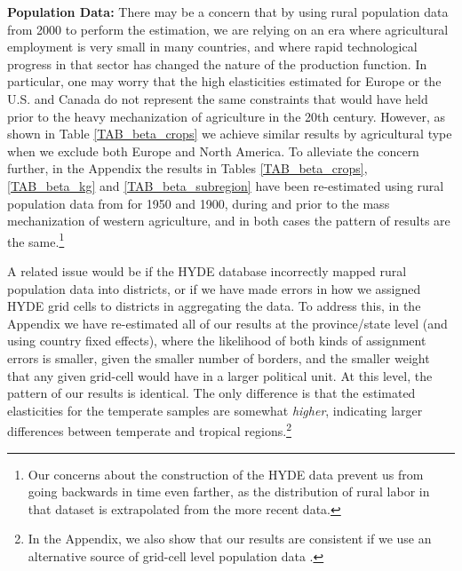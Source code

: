 \documentclass[11pt]{article}
\begin{document}
\vspace{.5cm}\noindent\textbf{Population Data:} There may be a concern that by using rural population data from 2000 to perform the estimation, we are relying on an era where agricultural employment is very small in many countries, and where rapid technological progress in that sector has changed the nature of the production function. In particular, one may worry that the high elasticities estimated for Europe or the U.S. and Canada do not represent the same constraints that would have held prior to the heavy mechanization of agriculture in the 20th century. However, as shown in Table \ref{TAB_beta_crops} we achieve similar results by agricultural type when we exclude both Europe and North America. To alleviate the concern further, in the Appendix the results in Tables \ref{TAB_beta_crops}, \ref{TAB_beta_kg} and \ref{TAB_beta_subregion} have been re-estimated using rural population data from \citet{hyde31} for 1950 and 1900, during and prior to the mass mechanization of western agriculture, and in both cases the pattern of results are the same.\footnote{Our concerns about the construction of the HYDE data prevent us from going backwards in time even farther, as the distribution of rural labor in that dataset is extrapolated from the more recent data.}

A related issue would be if the HYDE database incorrectly mapped rural population data into districts, or if we have made errors in how we assigned HYDE grid cells to districts in aggregating the data. To address this, in the Appendix we have re-estimated all of our results at the province/state level (and using country fixed effects), where the likelihood of both kinds of assignment errors is smaller, given the smaller number of borders, and the smaller weight that any given grid-cell would have in a larger political unit. At this level, the pattern of our results is identical. The only difference is that the estimated elasticities for the temperate samples are somewhat \textit{higher}, indicating larger differences between temperate and tropical regions.\footnote{In the Appendix, we also show that our results are consistent if we use an alternative source of grid-cell level population data \citep{grump2011}.}
\end{document}
